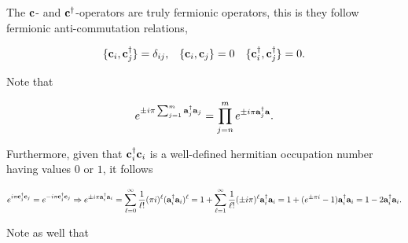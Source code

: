 \documentclass{homework}
\begin{document}
The ${\bf c}$- and ${\bf c}^\dagger$-operators are truly fermionic operators, this is they follow fermionic anti-commutation relations, 

\begin{align}
    \{{\bf c}_i, {\bf c}_j^\dagger\} &= \delta_{ij}, & \{{\bf c}_i, {\bf c}_j\} &= 0 & \{{\bf c}_i^\dagger, {\bf c}_j^\dagger\} = 0. 
\end{align}

Note that 

\begin{equation}
    e^{\pm i \pi \sum_{j = 1}^{m} {\bf a}_j^\dagger {\bf a}_j} = \prod_{j=n}^{m} e^{\pm i \pi {\bf a}_j^\dagger {\bf a}}. 
\end{equation}

Furthermore, given that ${\bf c}_i^\dagger {\bf c}_i$ is a well-defined hermitian occupation number having values $0$ or $1$, it follows 

\begin{equation}
\begin{split}
    &e^{i\pi {\bf c}_j^\dagger {\bf c}_j} =  e^{-i\pi {\bf c}_j^\dagger {\bf c}_j} \Rightarrow e^{\pm i \pi {\bf a}_i^\dagger {\bf a}_i} = \sum_{\ell = 0}^{\infty} \frac{1}{\ell!} (\pi i)^\ell ({\bf a}_i^\dagger {\bf a}_i)^\ell = 1 + \sum_{\ell = 1}^\infty \frac{1}{\ell!} (\pm i\pi)^\ell {\bf a}_i^\dagger {\bf a}_i = 1 + (e^{\pm \pi i} - 1) {\bf a}_i^\dagger {\bf a}_i = 1 - 2{\bf a}_i^\dagger {\bf a}_i. \\
\end{split}
\end{equation}

Note as well that
\end{document}
